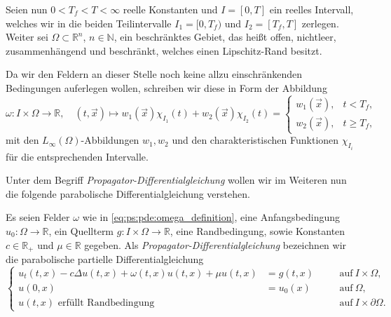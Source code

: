 Seien nun $0 < T_{f} < T < \infty$ reelle Konstanten und $I = [0, T]$ ein reelles Intervall, welches wir in die beiden Teilintervalle $I_{1} = [0, T_{f})$ und $I_{2} = [T_{f}, T]$ zerlegen.
Weiter sei $\Omega \subset \mathbb{R}^{n}$, $n \in \mathbb{N}$, ein beschränktes Gebiet, das heißt offen, nichtleer, zusammenhängend und beschränkt, welches einen Lipschitz-Rand besitzt.

Da wir den Feldern an dieser Stelle noch keine allzu einschränkenden Bedingungen auferlegen wollen, schreiben wir diese in Form der Abbildung
\begin{equation}
\label{eq:ps:pde:omega_definition}
    \omega \colon I \times \Omega \to \mathbb{R}, \quad (t, \vec{x}) \mapsto
    w_{1}(\vec{x}) \chi_{I_{1}}(t) + w_{2}(\vec{x}) \chi_{I_{2}}(t)
    =
    \begin{cases}
        w_{1}(\vec{x}), & t < T_{f}, \\
        w_{2}(\vec{x}), & t \geq T_{f},
    \end{cases}
\end{equation}
mit den $L_{\infty}(\Omega)$-Abbildungen $w_{1}, w_{2}$ und den charakteristischen Funktionen $\chi_{I_{i}}$ für die entsprechenden Intervalle.

Unter dem Begriff \emph{Propagator-Differentialgleichung} wollen wir im Weiteren nun die folgende parabolische Differentialgleichung verstehen.

\begin{Definition}
\label{def:ps:pde:propagator_dgl}
    Es seien Felder $\omega$ wie in \cref{eq:ps:pde:omega_definition}, eine Anfangsbedingung $u_{0} \colon \Omega \to \mathbb{R}$, ein Quellterm $g \colon I \times \Omega \to \mathbb{R}$, eine Randbedingung, sowie Konstanten $c \in \mathbb{R}_{+}$ und $\mu \in \mathbb{R}$ gegeben.
    Als \emph{Propagator-Differentialgleichung} bezeichnen wir die parabolische partielle Differentialgleichung
    \begin{equation}
    \label{eq:ps:pde:propagator_dgl}
        \left\{
        \begin{aligned}
            u_{t}(t, x) - c \Delta u(t, x) + \omega(t, x) u(t, x) + \mu u(t, x) &= g(t, x) \quad &&\text{auf}~I \times \Omega,\\
            u(0, x) &= u_{0}(x) \quad &&\text{auf}~\Omega, \\
            u(t, x) \text{ erfüllt Randbedingung} &\quad &&\text{auf}~I \times \partial \Omega.
        \end{aligned}
        \right.
    \end{equation}
\end{Definition}

